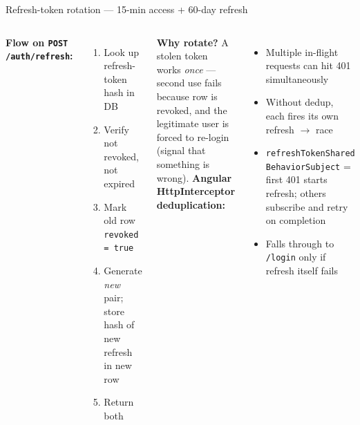 \documentclass[aspectratio=169,11pt]{beamer}
\begin{document}
\begin{frame}{Refresh-token rotation --- 15-min access + 60-day refresh}
  \begin{columns}[T]
    \footnotesize
    \textbf{Flow on \texttt{POST /auth/refresh}:}
    \begin{enumerate}
      \item Look up refresh-token hash in DB
      \item Verify not revoked, not expired
      \item \alert{Mark old row \texttt{revoked = true}}
      \item Generate \emph{new} pair; store hash of new refresh in new row
      \item Return both
    \end{enumerate}
    \vspace{4pt}
    \textbf{Why rotate?} A stolen token works \emph{once} --- second use fails because row is revoked, and the legitimate user is forced to re-login (signal that something is wrong).
    \footnotesize
    \textbf{Angular HttpInterceptor deduplication:}
    \begin{itemize}
      \item Multiple in-flight requests can hit 401 simultaneously
      \item Without dedup, each fires its own refresh $\rightarrow$ race
      \item \texttt{refreshTokenShared} \texttt{BehaviorSubject} = first 401 starts refresh; others subscribe and retry on completion
      \item Falls through to \texttt{/login} only if refresh itself fails
    \end{itemize}
  \end{columns}
\end{frame}
\end{document}
